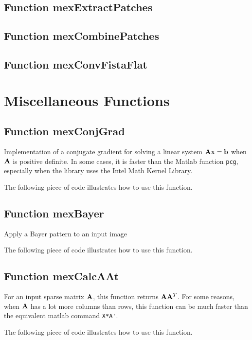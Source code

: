 \documentclass[a4paper, 11pt]{article}
\begin{document}
\subsection{Function mexExtractPatches}

\subsection{Function mexCombinePatches}

\subsection{Function mexConvFistaFlat}


\section{Miscellaneous Functions}

\subsection{Function mexConjGrad}

Implementation of a conjugate gradient for solving a linear system ${\mathbf A}{\mathbf x}={\mathbf b}$
when ${\mathbf A}$ is positive definite. In some cases, it is faster than the Matlab
function \verb|pcg|, especially when the library uses the Intel Math Kernel Library.
%    

The following piece of code illustrates how to use this function.


\subsection{Function mexBayer}

Apply a Bayer pattern to an input image
%    

The following piece of code illustrates how to use this function.



\subsection{Function mexCalcAAt}

For an input sparse matrix ${\mathbf A}$, this function returns ${\mathbf A}{\mathbf A}^T$. For some reasons, when ${\mathbf A}$ has a lot more columns than rows, this function can be much faster than the equivalent matlab command \verb|X*A'|.
%    

The following piece of code illustrates how to use this function.

\end{document}
